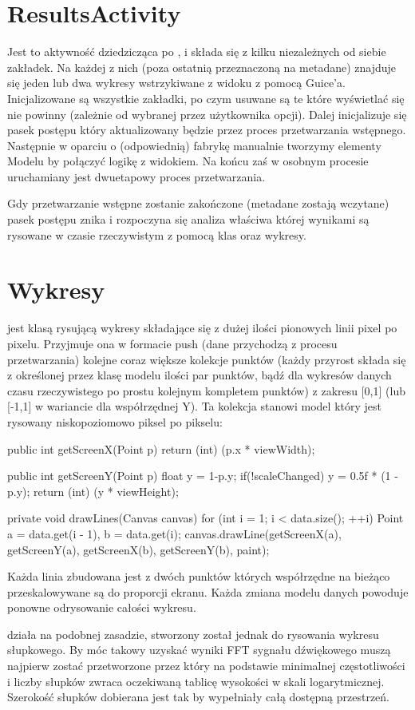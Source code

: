 \section{ResultsActivity}
Jest to aktywność dziedzicząca po , i składa się z kilku niezależnych od siebie zakładek. Na każdej z nich (poza ostatnią przeznaczoną na metadane) znajduje się jeden lub dwa wykresy wstrzykiwane z widoku z pomocą Guice'a. Inicjalizowane są wszystkie zakładki, po czym usuwane są te które wyświetlać się nie powinny (zależnie od wybranej przez użytkownika opcji). Dalej inicjalizuje się pasek postępu który aktualizowany będzie przez proces przetwarzania wstępnego. Następnie w oparciu o (odpowiednią) fabrykę manualnie tworzymy elementy Modelu by połączyć logikę z widokiem. Na końcu zaś w osobnym procesie uruchamiany jest dwuetapowy proces przetwarzania.

Gdy przetwarzanie wstępne zostanie zakończone (metadane zostają wczytane) pasek postępu znika i rozpoczyna się analiza właściwa której wynikami są rysowane w czasie rzeczywistym z pomocą klas  oraz  wykresy.

\section{Wykresy}
 jest klasą rysującą wykresy składające się z dużej ilości pionowych linii pixel po pixelu. Przyjmuje ona w formacie push (dane przychodzą z procesu przetwarzania) kolejne coraz większe kolekcje punktów (każdy przyrost składa się z określonej przez klasę modelu ilości par punktów, bądź dla wykresów danych czasu rzeczywistego po prostu kolejnym kompletem punktów) z zakresu [0,1] (lub [-1,1] w wariancie  dla współrzędnej Y). Ta kolekcja stanowi model który jest rysowany niskopoziomowo piksel po pikselu:
\begin{java}
    public int getScreenX(Point p) {
        return (int) (p.x * viewWidth);
    }
   
    public int getScreenY(Point p){
        float y = 1-p.y;
        if(!scaleChanged)
            y = 0.5f * (1 - p.y);
        return (int) (y * viewHeight);
    }

    private void drawLines(Canvas canvas) {
        for (int i = 1; i < data.size(); ++i) {
            Point a = data.get(i - 1), b = data.get(i);
            canvas.drawLine(getScreenX(a), getScreenY(a), getScreenX(b), getScreenY(b), paint);
        }
    }
\end{java}
Każda linia zbudowana jest z dwóch punktów których współrzędne na bieżąco przeskalowywane są do proporcji ekranu. Każda zmiana modelu danych powoduje ponowne odrysowanie całości wykresu.

 działa na podobnej zasadzie, stworzony został jednak do rysowania wykresu słupkowego. By móc takowy uzyskać wyniki FFT sygnału dźwiękowego muszą najpierw zostać przetworzone przez  który na podstawie minimalnej częstotliwości i liczby słupków zwraca oczekiwaną tablicę wysokości w skali logarytmicznej. Szerokość słupków dobierana jest tak by wypełniały całą dostępną przestrzeń.
